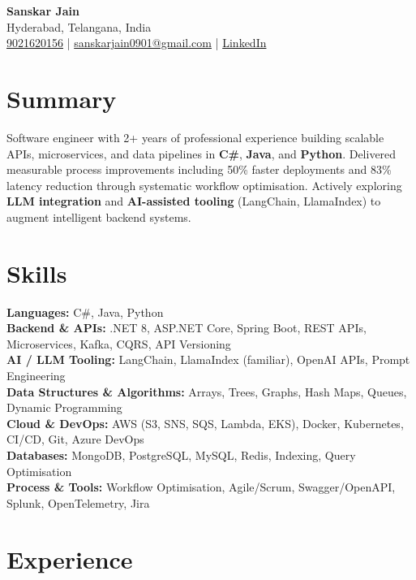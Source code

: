 \documentclass[letterpaper,10pt]{article}
\begin{document}
\begin{center}
    {\LARGE \textbf{Sanskar Jain}} \\
    Hyderabad, Telangana, India \\
    \href{tel:9021620156}{9021620156} \;|\;
    \href{mailto:sanskarjain0901@gmail.com}{sanskarjain0901@gmail.com} \;|\;
    \href{https://www.linkedin.com/in/sanskar-jain0901/}{LinkedIn}
\end{center}

\vspace{3pt}

\section*{Summary}
Software engineer with 2+ years of professional experience building scalable APIs, microservices, and data pipelines in \textbf{C\#}, \textbf{Java}, and \textbf{Python}.
Delivered measurable process improvements including 50\% faster deployments and 83\% latency reduction through systematic workflow optimisation.
Actively exploring \textbf{LLM integration} and \textbf{AI-assisted tooling} (LangChain, LlamaIndex) to augment intelligent backend systems.

\section*{Skills}
\textbf{Languages:} C\#, Java, Python \\
\textbf{Backend \& APIs:} .NET 8, ASP.NET Core, Spring Boot, REST APIs, Microservices, Kafka, CQRS, API Versioning \\
\textbf{AI / LLM Tooling:} LangChain, LlamaIndex (familiar), OpenAI APIs, Prompt Engineering \\
\textbf{Data Structures \& Algorithms:} Arrays, Trees, Graphs, Hash Maps, Queues, Dynamic Programming \\
\textbf{Cloud \& DevOps:} AWS (S3, SNS, SQS, Lambda, EKS), Docker, Kubernetes, CI/CD, Git, Azure DevOps \\
\textbf{Databases:} MongoDB, PostgreSQL, MySQL, Redis, Indexing, Query Optimisation \\
\textbf{Process \& Tools:} Workflow Optimisation, Agile/Scrum, Swagger/OpenAPI, Splunk, OpenTelemetry, Jira

\section*{Experience}
\end{document}
